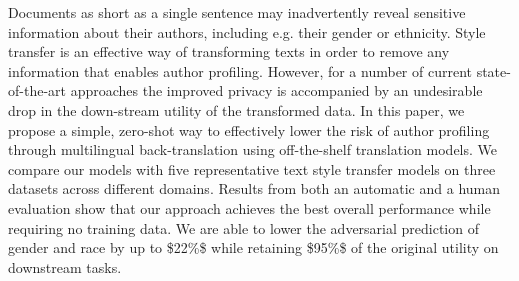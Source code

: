Documents as short as a single sentence may inadvertently reveal sensitive information about their authors, including e.g. their gender or ethnicity. Style transfer is an effective way of transforming texts in order to remove any information that enables author profiling. However, for a number of current state-of-the-art approaches the improved privacy is accompanied by an undesirable drop in the down-stream utility of the transformed data. In this paper, we propose a simple, zero-shot way to effectively lower the risk of author profiling through multilingual back-translation using off-the-shelf translation models. We compare our models with five representative text style transfer models on three datasets across different domains. Results from both an automatic and a human evaluation show that our approach achieves the best overall performance while requiring no training data. We are able to lower the adversarial prediction of gender and race by up to \$22\%\$ while retaining \$95\%\$ of the original utility on downstream tasks.
